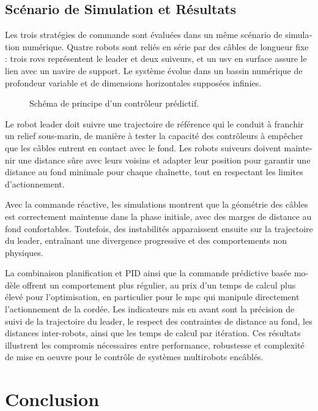 \begin{otherlanguage}{french}
	\subsection{Scénario de Simulation et Résultats}
	\label{sif_rcc_simulation}

	Les trois stratégies de commande sont évaluées dans un même scénario de simulation numérique.
	Quatre robots sont reliés en série par des câbles de longueur fixe : trois \acp{rov} représentent
	le leader et deux suiveurs, et un \ac{usv} en surface assure le lien avec un navire de support. Le
	système évolue dans un bassin numérique de profondeur variable et de dimensions horizontales
	supposées infinies.

	\begin{figure}
		\centering
		\caption{
			Schéma de principe d'un contrôleur prédictif.
		}
	\end{figure}

	Le robot leader doit suivre une trajectoire de référence qui le conduit à franchir un relief
	sous-marin, de manière à tester la capacité des contrôleurs à empêcher que les câbles entrent en
	contact avec le fond. Les robots suiveurs doivent maintenir une distance sûre avec leurs voisins et
	adapter leur position pour garantir une distance au fond minimale pour chaque chaînette, tout en
	respectant les limites d'actionnement.

	Avec la commande réactive, les simulations montrent que la géométrie des câbles est correctement
	maintenue dans la phase initiale, avec des marges de distance au fond confortables. Toutefois, des
	instabilités apparaissent ensuite sur la trajectoire du leader, entraînant une divergence
	progressive et des comportements non physiques.

	La combinaison planification et PID ainsi que la commande prédictive basée modèle offrent un
	comportement plus régulier, au prix d'un temps de calcul plus élevé pour l'optimisation, en
	particulier pour le \ac{mpc} qui manipule directement l'actionnement de la cordée. Les indicateurs
	mis en avant sont la précision de suivi de la trajectoire du leader, le respect des contraintes de
	distance au fond, les distances inter-robots, ainsi que les temps de calcul par itération. Ces
	résultats illustrent les compromis nécessaires entre performance, robustesse et complexité de mise
	en oeuvre pour le contrôle de systèmes multirobots encâblés.

	\section{Conclusion}
	\label{sif_conclusion}


\end{otherlanguage}
